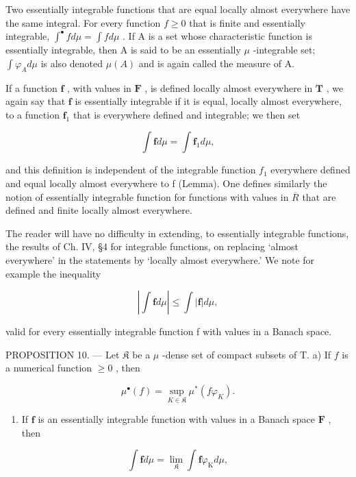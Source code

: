 Two essentially integrable functions that are equal locally almost everywhere have the same integral. For every function \(f \geqslant 0\) that is finite and essentially integrable, \(\int^{\bullet} f d\mu = \int f d\mu\) . If A is a set whose characteristic function is essentially integrable, then A is said to be an essentially \(\mu\) -integrable set; \(\int \varphi_{A} d\mu\) is also denoted \(\mu(A)\) and is again called the measure of A.

If a function \(\mathbf{f}\) , with values in \(\mathbf{F}\) , is defined locally almost everywhere in \(\mathbf{T}\) , we again say that \(\mathbf{f}\) is essentially integrable if it is equal, locally almost everywhere, to a function \(\mathbf{f}_1\) that is everywhere defined and integrable; we then set

\[
\int \mathbf {f} d \mu = \int \mathbf {f} _ {1} d \mu ,
\]

and this definition is independent of the integrable function \(f_{1}\) everywhere defined and equal locally almost everywhere to f (Lemma). One defines similarly the notion of essentially integrable function for functions with values in \(\overline{R}\) that are defined and finite locally almost everywhere.

The reader will have no difficulty in extending, to essentially integrable functions, the results of Ch. IV, §4 for integrable functions, on replacing `almost everywhere' in the statements by `locally almost everywhere.' We note for example the inequality

\[
\left| \int \mathbf {f} d \mu \right| \leqslant \int | \mathbf {f} | d \mu ,\tag{3}
\]

valid for every essentially integrable function f with values in a Banach space.

PROPOSITION 10. --- Let \(\mathfrak{K}\) be a \(\mu\) -dense set of compact subsets of T. a) If \(f\) is a numerical function \(\geqslant 0\) , then

\[
\mu^ {\bullet} (f) = \sup _ {K \in \mathfrak {K}} \mu^ {*} (f \varphi_ {K}).\tag{4}
\]

\begin{enumerate}
\def\labelenumi{\alph{enumi})}
\setcounter{enumi}{1}
\tightlist
\item
  If \(\mathbf{f}\) is an essentially integrable function with values in a Banach space \(\mathbf{F}\) , then
\end{enumerate}

\[
\int \mathbf {f} d \mu = \lim _ {\mathfrak {K}} \int \mathbf {f} \varphi_ {\mathrm{K}} d \mu ,
\]

